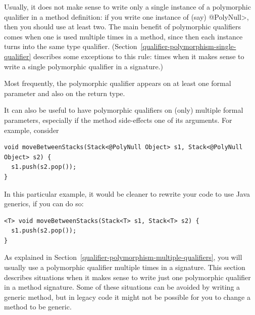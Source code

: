 

Usually, it does not make sense to write only a single instance of a polymorphic
qualifier in a method definition:  if you write one instance of (say)
\<@PolyNull>, then you should use at least two.
The main benefit of polymorphic qualifiers comes when one is used multiple times
in a method, since then each instance turns into the same type qualifier.
(Section~\ref{qualifier-polymorphism-single-qualifier} describes some
exceptions to this rule:  times when it makes sense to write a single
polymorphic qualifier in a signature.)

Most frequently, the polymorphic qualifier appears on at least one formal
parameter and also on the return type.



  It can also be useful to have
polymorphic qualifiers on (only) multiple formal parameters, especially if
the method side-effects one of its arguments.
For example, consider

\begin{Verbatim}
void moveBetweenStacks(Stack<@PolyNull Object> s1, Stack<@PolyNull Object> s2) {
  s1.push(s2.pop());
}
\end{Verbatim}

\noindent
In this particular example, it would be cleaner to rewrite your code to use
Java generics, if you can do so:

\begin{Verbatim}
<T> void moveBetweenStacks(Stack<T> s1, Stack<T> s2) {
  s1.push(s2.pop());
}
\end{Verbatim}



As explained in Section~\ref{qualifier-polymorphism-multiple-qualifiers},
you will usually use a polymorphic qualifier
multiple times in a signature.
This section describes situations when it makes sense to write just one
polymorphic qualifier in a method signature.
Some of these situations can be avoided by writing a generic method,
but in legacy code it might not be possible for you to change a method to be
generic.


